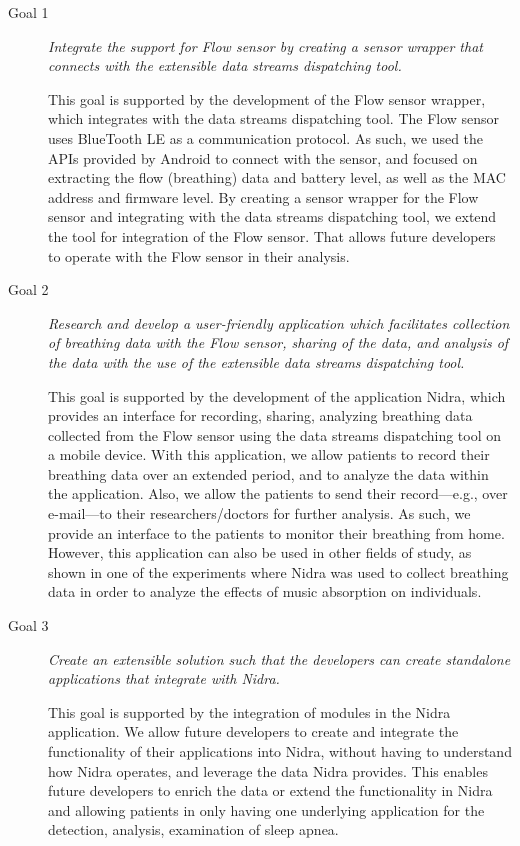\begin{description}
    \item[Goal 1] \textit{Integrate the support for Flow sensor by creating a sensor wrapper that connects with the extensible data streams dispatching tool.}

    This goal is supported by the development of the Flow sensor wrapper, which integrates with the data streams dispatching tool. The Flow sensor uses BlueTooth LE as a communication protocol. As such, we used the APIs provided by Android to connect with the sensor, and focused on extracting the flow (breathing) data and battery level, as well as the MAC address and firmware level. By creating a sensor wrapper for the Flow sensor and integrating with the data streams dispatching tool, we extend the tool for integration of the Flow sensor. That allows future developers to operate with the Flow sensor in their analysis.\\

    \item[Goal 2] \textit{Research and develop a user-friendly application which facilitates collection of breathing data with the Flow sensor, sharing of the data, and analysis of the data with the use of the extensible data streams dispatching tool.}

    This goal is supported by the development of the application Nidra, which provides an interface for recording, sharing, analyzing breathing data collected from the Flow sensor using the data streams dispatching tool on a mobile device. With this application, we allow patients to record their breathing data over an extended period, and to analyze the data within the application. Also, we allow the patients to send their record---e.g., over e-mail---to their researchers/doctors for further analysis. As such, we provide an interface to the patients to monitor their breathing from home. However, this application can also be used in other fields of study, as shown in one of the experiments where Nidra was used to collect breathing data in order to analyze the effects of music absorption on individuals.
    
    \item[Goal 3] \textit{Create an extensible solution such that the developers can create standalone applications that integrate with Nidra.}

    This goal is supported by the integration of modules in the Nidra application. We allow future developers to create and integrate the functionality of their applications into Nidra, without having to understand how Nidra operates, and leverage the data Nidra provides. This enables future developers to enrich the data or extend the functionality in Nidra and allowing patients in only having one underlying application for the detection, analysis, examination of sleep apnea.
\end{description}



